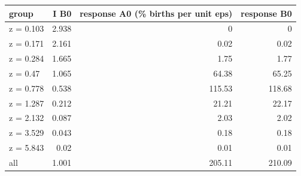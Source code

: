 \begin{tabular}{lrrr}
\toprule
group & I B0 & response A0 (\% births per unit eps) & response B0 \\
\midrule
z = 0.103 & 2.938 & 0 & 0 \\
z = 0.171 & 2.161 & 0.02 & 0.02 \\
z = 0.284 & 1.665 & 1.75 & 1.77 \\
z = 0.47 & 1.065 & 64.38 & 65.25 \\
z = 0.778 & 0.538 & 115.53 & 118.68 \\
z = 1.287 & 0.212 & 21.21 & 22.17 \\
z = 2.132 & 0.087 & 2.03 & 2.02 \\
z = 3.529 & 0.043 & 0.18 & 0.18 \\
z = 5.843 & 0.02 & 0.01 & 0.01 \\
all & 1.001 & 205.11 & 210.09 \\
\bottomrule
\end{tabular}
